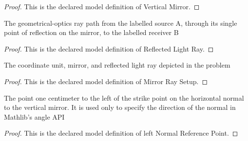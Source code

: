 \begin{proof}
  This is the declared model definition of Vertical Mirror.
\end{proof}
\begin{definition}
  \label{def:physics:phyx-mini-0061:phyxminiproblems-problemphyxmini0061-reflectedlightray}
  The geometrical-optics ray path from the labelled source A, through its single point of reflection on the mirror, to the labelled receiver B
\end{definition}
\begin{proof}
  This is the declared model definition of Reflected Light Ray.
\end{proof}
\begin{definition}
  \label{def:physics:phyx-mini-0061:phyxminiproblems-problemphyxmini0061-mirrorraysetup}
  The coordinate unit, mirror, and reflected light ray depicted in the problem
\end{definition}
\begin{proof}
  This is the declared model definition of Mirror Ray Setup.
\end{proof}
\begin{definition}
  \label{def:physics:phyx-mini-0061:phyxminiproblems-problemphyxmini0061-leftnormalreferencepoint}
  The point one centimeter to the left of the strike point on the horizontal normal to the vertical mirror. It is used only to specify the direction of the normal in Mathlib's angle API
\end{definition}
\begin{proof}
  This is the declared model definition of left Normal Reference Point.
\end{proof}
